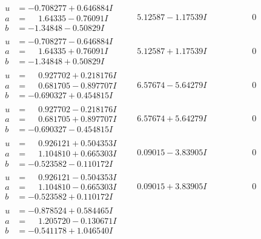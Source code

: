 \documentclass[1p]{elsarticle_modified}
\theoremstyle{definition}
\begin{document}
$$\begin{array}{c|c|c}
\begin{aligned}
u &= -0.708277 + 0.646884 I \\
a &= \phantom{-}1.64335 - 0.76091 I \\
b &= -1.34848 - 0.50829 I\end{aligned}
 & \phantom{-}5.12587 - 1.17539 I & \phantom{-0.000000 } 0 \\ \hline\begin{aligned}
u &= -0.708277 - 0.646884 I \\
a &= \phantom{-}1.64335 + 0.76091 I \\
b &= -1.34848 + 0.50829 I\end{aligned}
 & \phantom{-}5.12587 + 1.17539 I & \phantom{-0.000000 } 0 \\ \hline\begin{aligned}
u &= \phantom{-}0.927702 + 0.218176 I \\
a &= \phantom{-}0.681705 - 0.897707 I \\
b &= -0.690327 + 0.454815 I\end{aligned}
 & \phantom{-}6.57674 - 5.64279 I & \phantom{-0.000000 } 0 \\ \hline\begin{aligned}
u &= \phantom{-}0.927702 - 0.218176 I \\
a &= \phantom{-}0.681705 + 0.897707 I \\
b &= -0.690327 - 0.454815 I\end{aligned}
 & \phantom{-}6.57674 + 5.64279 I & \phantom{-0.000000 } 0 \\ \hline\begin{aligned}
u &= \phantom{-}0.926121 + 0.504353 I \\
a &= \phantom{-}1.104810 + 0.665303 I \\
b &= -0.523582 - 0.110172 I\end{aligned}
 & \phantom{-}0.09015 - 3.83905 I & \phantom{-0.000000 } 0 \\ \hline\begin{aligned}
u &= \phantom{-}0.926121 - 0.504353 I \\
a &= \phantom{-}1.104810 - 0.665303 I \\
b &= -0.523582 + 0.110172 I\end{aligned}
 & \phantom{-}0.09015 + 3.83905 I & \phantom{-0.000000 } 0 \\ \hline\begin{aligned}
u &= -0.878524 + 0.584465 I \\
a &= \phantom{-}1.205720 - 0.130671 I \\
b &= -0.541178 + 1.046540 I\end{aligned}

\end{array}$$
\end{document}
